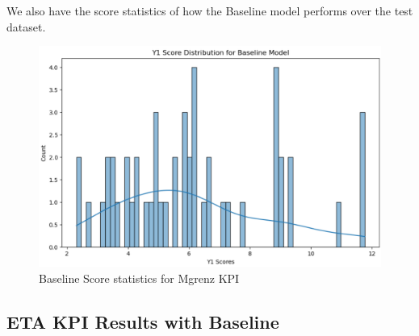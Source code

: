 \documentclass{report} %
\begin{document}
\vspace{0.2cm} %




We also have the score statistics of how the Baseline model performs over the test dataset.\\

\begin{figure}[H]
    \centering
    \includegraphics[width=1\textwidth]{./ReportImages/score_baseline_y1.png} 
    \caption{Baseline Score statistics for Mgrenz \ac{KPI}} 
    \label{fig:Baseline Score statistics for 2D KPI(Mgrenz)}
\end{figure}

\subsection{ETA \ac{KPI} Results with Baseline}\label{sec:3D ETA Grid Results with Baseline}
\end{document}
